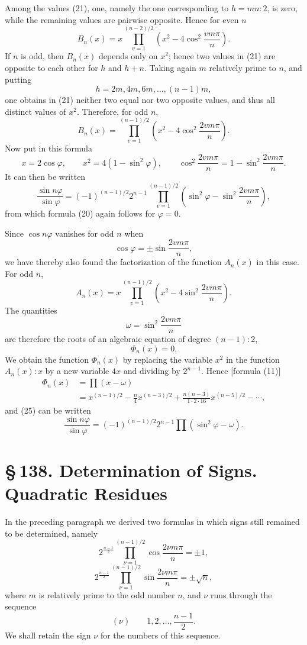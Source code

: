 \documentclass[11pt]{article}
\providecommand{\sect}[2]{\section*{\S\,#1. #2}}
\begin{document}
Among the values (21), one, namely the one corresponding to $h=mn:2$, is zero, while the remaining values are pairwise opposite. Hence for even $n$
\[
\tag{23}       B_n(x)=x\prod_{v=1}^{(n-2)/2}\left(x^2-4\cos^2\frac{v m\pi}{n}\right).
\]
If $n$ is odd, then $B_n(x)$ depends only on $x^2$; hence two values in (21) are opposite to each other for $h$ and $h+n$. Taking again $m$ relatively prime to $n$, and putting
\[
        h=2m,4m,6m,\ldots,(n-1)m,
\]
one obtains in (21) neither two equal nor two opposite values, and thus all distinct values of $x^2$. Therefore, for odd $n$,
\[
\tag{24}       B_n(x)=\prod_{v=1}^{(n-1)/2}
\left(x^2-4\cos^2\frac{2vm\pi}{n}\right).
\]
Now put in this formula
\[
        x=2\cos\varphi,
        \qquad x^2=4(1-\sin^2\varphi),
        \qquad \cos^2\frac{2vm\pi}{n}=1-\sin^2\frac{2vm\pi}{n}.
\]
It can then be written
\[
\tag{25}       \frac{\sin n\varphi}{\sin\varphi}
=(-1)^{(n-1)/2}2^{n-1}\prod_{v=1}^{(n-1)/2}
\left(\sin^2\varphi-\sin^2\frac{2vm\pi}{n}\right),
\]
from which formula (20) again follows for $\varphi=0$.

Since $\cos n\varphi$ vanishes for odd $n$ when
\[
        \cos\varphi=\pm\sin\frac{2vm\pi}{n},
\]
we have thereby also found the factorization of the function $A_n(x)$ in this case. For odd $n$,
\[
\tag{26}       A_n(x)=x\prod_{v=1}^{(n-1)/2}
\left(x^2-4\sin^2\frac{2vm\pi}{n}\right).
\]
The quantities
\[
\tag{27}       \omega=\sin^2\frac{2vm\pi}{n}
\]
are therefore the roots of an algebraic equation of degree $(n-1):2$,
\[
        \Phi_n(x)=0.
\]
We obtain the function $\Phi_n(x)$ by replacing the variable $x^2$ in the function $A_n(x):x$ by a new variable $4x$ and dividing by $2^{n-1}$. Hence [formula (11)]
\[
\tag{28}\begin{aligned}
\Phi_n(x)&=\prod(x-\omega)\\
&=x^{(n-1)/2}-\frac n4 x^{(n-3)/2}
+\frac{n(n-3)}{1\cdot2\cdot16}x^{(n-5)/2}-\cdots,
\end{aligned}
\]
and (25) can be written
\[
\tag{29}       \frac{\sin n\varphi}{\sin\varphi}
=(-1)^{(n-1)/2}2^{n-1}\prod(\sin^2\varphi-\omega).
\]


\sect{138}{Determination of Signs. Quadratic Residues}

In the preceding paragraph we derived two formulas in which signs still remained to be determined, namely
\[
\tag{1}
2^{\frac{n-1}{2}}\prod_{\nu=1}^{(n-1)/2}\cos\frac{2\nu m\pi}{n}=\pm1,
\]
\[
\tag{2}
2^{\frac{n-1}{2}}\prod_{\nu=1}^{(n-1)/2}\sin\frac{2\nu m\pi}{n}=\pm\sqrt n,
\]
where $m$ is relatively prime to the odd number $n$, and $\nu$ runs through the sequence
\[
(\nu)\qquad 1,2,\ldots,\frac{n-1}{2}.
\]
We shall retain the sign $\nu$ for the numbers of this sequence.
\end{document}
